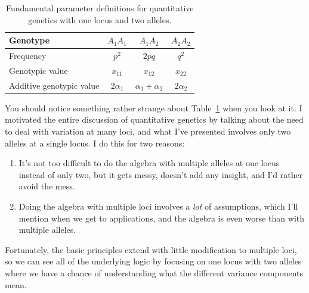 \begin{table}
\begin{center}
\begin{tabular}{l|ccc}
\hline\hline
Genotype                 & $A_1A_1$    & $A_1A_2$ & $A_2A_2$ \\
\hline
Frequency                & $p^2$       & $2pq$    & $q^2$ \\
Genotypic value          & $x_{11}$    & $x_{12}$ & $x_{22}$ \\
Additive genotypic value & $2\alpha_1$ & $\alpha_1 + \alpha_2$ 
                                                  & $2\alpha_2$ \\
\hline
\end{tabular}
\end{center}
\caption{Fundamental parameter definitions for quantitative genetics
  with one locus and two alleles.}\label{table:definitions}
\end{table}

You should notice something rather strange about
Table~\ref{table:definitions} when you look at it. I motivated the
entire discussion of quantitative genetics by talking about the need
to deal with variation at many loci, and what I've presented involves
only two alleles at a single locus. I do this for two reasons:

\begin{enumerate}

\item It's not too difficult to do the algebra with multiple alleles
  at one locus instead of only two, but it gets messy, doesn't add any
  insight, and I'd rather avoid the mess.

\item Doing the algebra with multiple loci involves a {\it lot\/} of
  assumptions, which I'll mention when we get to applications, and the
  algebra is even worse than with multiple alleles.

\end{enumerate}

\noindent Fortunately, the basic principles extend with little
modification to multiple loci, so we can see all of the underlying
logic by focusing on one locus with two alleles where we have a chance
of understanding what the different variance components mean.

